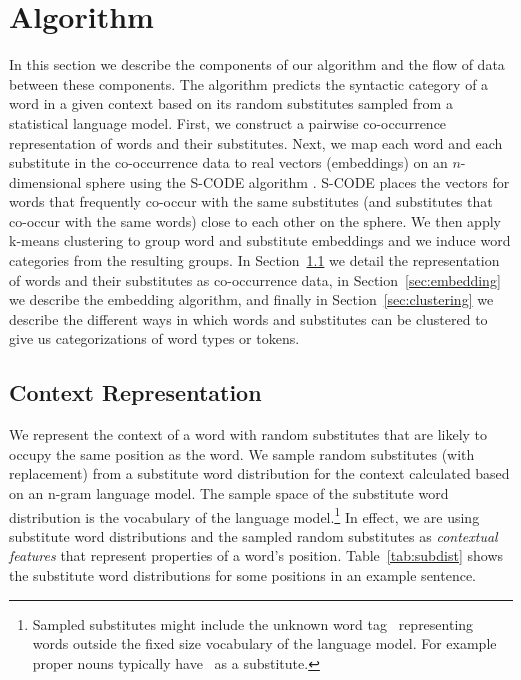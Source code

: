 \section{Algorithm}

In this section we describe the components of our algorithm and the
flow of data between these components.  The algorithm predicts the
syntactic category of a word in a given context based on its random
substitutes sampled from a statistical language model.  First, we
construct a pairwise co-occurrence representation of words and their
substitutes.  Next, we map each word and each substitute in the
co-occurrence data to real vectors (embeddings) on an $n$-dimensional
sphere using the S-CODE algorithm \cite{maron2010sphere}.  S-CODE
places the vectors for words that frequently co-occur with the same
substitutes (and substitutes that co-occur with the same words) close
to each other on the sphere.  We then apply k-means clustering to
group word and substitute embeddings and we induce word categories
from the resulting groups.  In Section~\ref{sec:cooc} we detail the
representation of words and their substitutes as co-occurrence data,
in Section~\ref{sec:embedding} we describe the embedding algorithm,
and finally in Section~\ref{sec:clustering} we describe the different
ways in which words and substitutes can be clustered to give us
categorizations of word types or tokens.


\subsection{Context Representation}
\label{sec:cooc}

We represent the context of a word with random substitutes that are
likely to occupy the same position as the word.  We sample random
substitutes (with replacement) from a substitute word distribution for
the context calculated based on an n-gram language model.  The sample
space of the substitute word distribution is the vocabulary of the
language model.\footnote{Sampled substitutes might include the unknown
  word tag \unk\ representing words outside the fixed size
  vocabulary of the language model.  For example proper nouns
  typically have \unk\ as a substitute.}  In effect, we are using
substitute word distributions and the sampled random substitutes as
{\em contextual features} that represent properties of a word's
position.  Table~\ref{tab:subdist} shows the substitute word
distributions for some positions in an example sentence.

